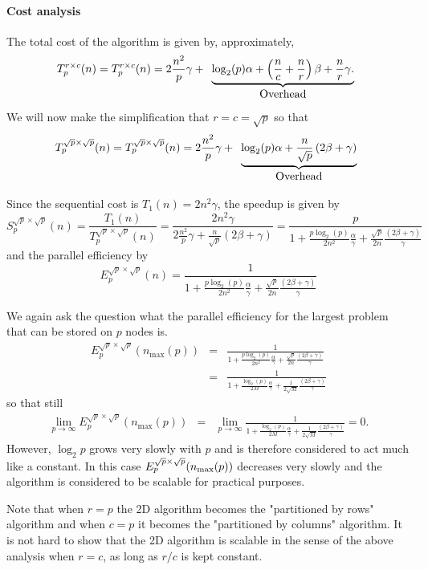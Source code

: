 \paragraph*{Cost analysis}

The total cost of the algorithm is given by, approximately,
\[
T_p^{r \times c}(n) = T_p^{r \times c}( n) = 
2 \frac{n^2}{p} \gamma + 
\begin{array}[t]{c}
\underbrace{\log_2(p) \alpha + \left( \frac{n}{c} + \frac{n}{r} \right) \beta + \frac{n}{r} \gamma.}
\\
\mbox{Overhead}
\end{array}
\]
We will now make the simplification that $ r = c = \sqrt{p} $ so that
\[
T_p^{\sqrt{p} \times \sqrt{p}}(n) = T_p^{\sqrt{p} \times \sqrt{p}}( n) = 
2 \frac{n^2}{p} \gamma + 
\begin{array}[t]{c}
\underbrace{\log_2(p) \alpha + \frac{n}{\sqrt{p}}\left( 2 \beta+ \gamma \right) 
}
\\
\mbox{Overhead}
\end{array}
\]

Since the sequential cost is $ T_1(n) = 2 n^2 \gamma $, the speedup is given by
\[
S_p^{\sqrt{p} \times \sqrt{p}}(n) = 
\frac{T_1(n)}
{T_p^{\sqrt{p} \times \sqrt{p}}(n)} = 
\frac{2 n^2 \gamma}
{ 2 \frac{n^2}{p} \gamma + \frac{n}{\sqrt{p}}
\left( 2 \beta + \gamma \right)}
= 
\frac{p}
{ 1 + \frac{p \log_2(p)}{2 n^2} \frac{\alpha}{\gamma} 
+ \frac{\sqrt{p}}{2n}\frac{
\left( 2 \beta + \gamma \right)}{\gamma}}
\]
and the parallel efficiency by
\[
E_p^{\sqrt{p} \times \sqrt{p}}(n) = 
\frac{1}
{ 1 + \frac{p \log_2(p)}{2 n^2} \frac{\alpha}{\gamma} 
+ \frac{\sqrt{p}}{2n}\frac{
\left( 2 \beta + \gamma \right)}{\gamma}}
\]

We again ask the question what the parallel 
efficiency for the largest problem that can be stored on $ p $ nodes is.
\begin{eqnarray*}
E_p^{\sqrt{p} \times \sqrt{p}}(n_{\max}(p)) &=& 
\frac{1}
{ 1 + \frac{p \log_2(p)}{2 n^2} \frac{\alpha}{\gamma} 
+ \frac{\sqrt{p}}{2n}\frac{
\left( 2 \beta + \gamma \right)}{\gamma}}
\\
&=&
\frac{1}
{ 1 + \frac{\log_2(p)}{2 M} \frac{\alpha}{\gamma} 
+ \frac{1}{2\sqrt{M}}\frac{
\left( 2 \beta + \gamma \right)}{\gamma}}
\end{eqnarray*}
so that still
\begin{eqnarray*}
\lim_{p \rightarrow \infty}
E_p^{\sqrt{p} \times \sqrt{p}}(n_{\max}(p)) &=& 
\lim_{p \rightarrow \infty}
\frac{1}
{ 1 + \frac{\log_2(p)}{2 M} \frac{\alpha}{\gamma} 
+ \frac{1}{2\sqrt{M}}\frac{
\left( 2 \beta + \gamma \right)}{\gamma}}
=
0.
\end{eqnarray*}
However, $ \log_2{p} $ grows very slowly with $ p $ and is therefore
considered to act much like a constant.  In this case 
$ E_p^{\sqrt{p}\times \sqrt{p}}( n_{\rm max}(p) ) $ decreases very slowly and the algorithm is considered to be scalable for practical purposes.


Note that when $ r = p $ the 2D algorithm becomes the "partitioned by
rows" algorithm and when $ c = p $ it becomes the "partitioned by
columns" algorithm.  It is not hard to show that the 2D algorithm is
scalable in the sense of the above analysis
when $ r = c $, as long as $ r / c
$ is kept constant.
